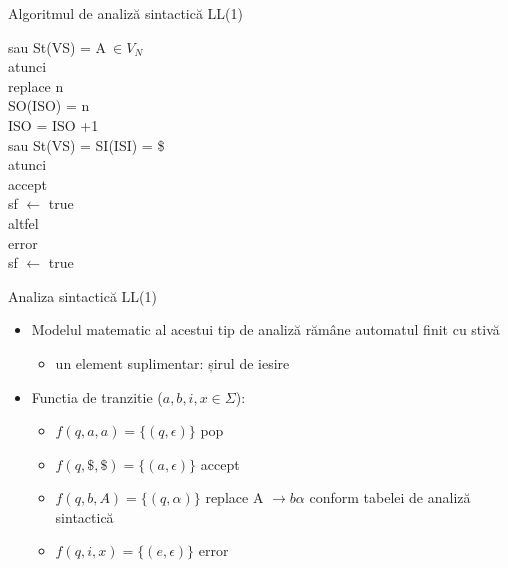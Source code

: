 \documentclass[pdf]{beamer}
\begin{document}
\begin{frame}{Algoritmul de analiză sintactică LL(1)}
\begin{tabbing}
sau St(VS) = A$\ \in V_N$  \\

atunci \= \\

\> replace n \\
\> SO(ISO) = n \\
\> ISO = ISO +1 \\

sau St(VS) = SI(ISI) = \$    \\

atunci \\
\> accept\\
\> sf $\leftarrow$ true\\

altfel \\
\> error\\
\> sf $\leftarrow$ true\\
\end{tabbing}
\end{frame}



\begin{frame}{Analiza sintactică LL(1)}
\begin{itemize}
\item 
Modelul matematic al acestui tip de analiză rămâne automatul finit cu stivă 
\begin{itemize}
\item
un element suplimentar: șirul de iesire
\end{itemize}

\item Functia de tranzitie ($a,b,i,x \in \Sigma$):

\begin{itemize}
\item $f(q, a, a) = \{(q, \epsilon)\}$	pop

\item $f(q, \$, \$) = \{(a, \epsilon)\}$	accept

\item $f(q, b, A) = \{(q, \alpha)\}$	replace A $\rightarrow b\alpha$ conform tabelei de analiză sintactică

\item $f(q, i, x) = \{(e, \epsilon)\}$	error
\end{itemize}
\end{itemize}
\end{frame}
\end{document}
